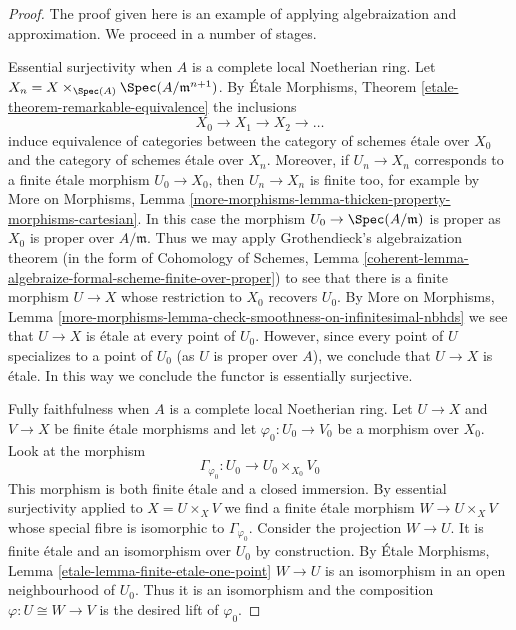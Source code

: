 \begin{proof}
The proof given here is an example of applying algebraization and
approximation. We proceed in a number of stages.

\medskip\noindent
Essential surjectivity when $A$ is a complete local Noetherian ring.
Let $X_n = X \times_{\Spec(A)} \Spec(A/\mathfrak m^{n + 1})$.
By \'Etale Morphisms, Theorem \ref{etale-theorem-remarkable-equivalence}
the inclusions
$$
X_0 \to X_1 \to X_2 \to \ldots
$$
induce equivalence of categories between the category
of schemes \'etale over $X_0$ and the category of schemes
\'etale over $X_n$.
Moreover, if $U_n \to X_n$ corresponds to a finite \'etale
morphism $U_0 \to X_0$, then $U_n \to X_n$ is finite too, for example
by More on Morphisms, Lemma
\ref{more-morphisms-lemma-thicken-property-morphisms-cartesian}.
In this case the morphism $U_0 \to \Spec(A/\mathfrak m)$
is proper as $X_0$ is proper over $A/\mathfrak m$. Thus we may apply
Grothendieck's algebraization theorem
(in the form of
Cohomology of Schemes, Lemma
\ref{coherent-lemma-algebraize-formal-scheme-finite-over-proper})
to see that there is a finite morphism $U \to X$ whose restriction
to $X_0$ recovers $U_0$. By More on Morphisms, Lemma
\ref{more-morphisms-lemma-check-smoothness-on-infinitesimal-nbhds}
we see that $U \to X$ is \'etale at every point of $U_0$.
However, since every point of $U$ specializes to a point of $U_0$
(as $U$ is proper over $A$), we conclude that $U \to X$ is \'etale.
In this way we conclude the functor is essentially surjective.

\medskip\noindent
Fully faithfulness when $A$ is a complete local Noetherian ring.
Let $U \to X$ and $V \to X$ be finite \'etale morphisms and
let $\varphi_0 : U_0 \to V_0$ be a morphism over $X_0$. Look at
the morphism
$$
\Gamma_{\varphi_0} : U_0 \longrightarrow U_0 \times_{X_0} V_0
$$
This morphism is both finite \'etale and a closed immersion.
By essential surjectivity applied to $X = U \times_X V$ we find
a finite \'etale morphism $W \to U \times_X V$ whose special
fibre is isomorphic to $\Gamma_{\varphi_0}$. Consider the projection
$W \to U$. It is finite \'etale and an isomorphism over $U_0$ by
construction. By \'Etale Morphisms, Lemma
\ref{etale-lemma-finite-etale-one-point}
$W \to U$ is an isomorphism in an open neighbourhood of $U_0$.
Thus it is an isomorphism and the composition $\varphi : U \cong W \to V$
is the desired lift of $\varphi_0$.


\end{proof}
